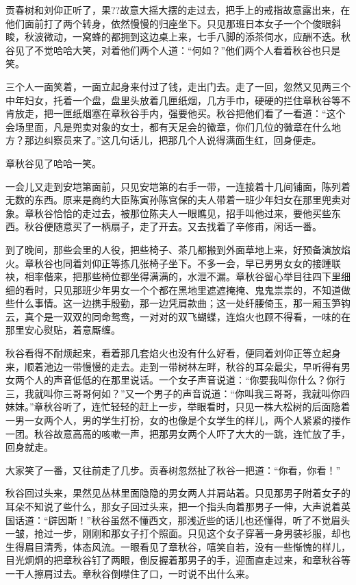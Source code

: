 \documentclass[12pt,UTF8]{ctexbook}
\begin{document}
{{{贡春树和刘仰正听了，果??故意大摇大摆的走过去，把手上的戒指故意露出来，在他们面前打了两个转身，依然慢慢的归座坐下。只见那班日本女子一个个俊眼斜睃，秋波微动，一窝蜂的都拥到这边桌上来，七手八脚的添茶伺水，应酬不迭。秋谷见了不觉哈哈大笑，对着他们两个人道：“何如？”他们两个人看着秋谷也只是笑。

三个人一面笑着，一面立起身来付过了钱，走出门去。走了一回，忽然又见两三个中年妇女，托着一个盘，盘里头放着几匣纸烟，几方手巾，硬硬的拦住章秋谷等不肯放走，把一匣纸烟塞在章秋谷手内，强要他买。秋谷把他们看了一看道：“这个会场里面，凡是兜卖对象的女士，都有天足会的徽章，你们几位的徽章在什么地方？那边纠察员来了。”这几句话儿，把那几个人说得满面生红，回身便走。

章秋谷见了哈哈一笑。

一会儿又走到安垲第面前，只见安垲第的右手一带，一连接着十几间铺面，陈列着无数的东西。原来是商约大臣陈寅孙陈宫保的夫人带着一班少年妇女在那里兜卖对象。章秋谷恰恰的走过去，被那位陈夫人一眼瞧见，招手叫他过来，要他买些东西。秋谷便随意买了一柄扇子，走了开去。又去找着了辛修甫，闲话一番。

到了晚间，那些会里的人役，把些椅子、茶几都搬到外面草地上来，好预备演放焰火。章秋谷也同着刘仰正等拣几张椅子坐下。不多一会，早已男男女女的接踵联袂，相率偕来，把那些椅位都坐得满满的，水泄不漏。章秋谷留心举目往四下里细细的看时，只见那班少年男女一个个都在黑地里遮遮掩掩、鬼鬼祟祟的，不知道做些什么事情。这一边携手殷勤，那一边凭肩款曲；这一处纤腰倚玉，那一厢玉笋钩云，真个是一双双的同命鸳鸯，一对对的双飞蝴蝶，连焰火也顾不得看，一味的在那里安心熨贴，着意厮缠。

秋谷看得不耐烦起来，看着那几套焰火也没有什么好看，便同着刘仰正等立起身来，顺着池边一带慢慢的走去。走到一带树林左畔，秋谷的耳朵最尖，早听得有男女两个人的声音低低的在那里说话。一个女子声音说道：“你要我叫你什么？你行三，我就叫你三哥哥何如？”又一个男子的声音说道：“你叫我三哥哥，我就叫你四妹妹。”章秋谷听了，连忙轻轻的赶上一步，举眼看时，只见一株大松树的后面隐着一男一女两个人，男的学生打扮，女的也像是个女学生的样儿，两个人紧紧的搂作一团。秋谷故意高高的咳嗽一声，把那男女两个人吓了大大的一跳，连忙放了手，回身就走。

大家笑了一番，又往前走了几步。贡春树忽然扯了秋谷一把道：“你看，你看！”

秋谷回过头来，果然见丛林里面隐隐的男女两人并肩站着。只见那男子附着女子的耳朵不知说了些什么，那女子回过头来，把一个指头向着那男子一伸，大声说着英国话道：“辟因斯！”秋谷虽然不懂西文，那浅近些的话儿也还懂得，听了不觉眉头一皱，抢过一步，刚刚和那女子打个照面。只见这个女子穿著一身男装衫服，却也生得眉目清秀，体态风流。一眼看见了章秋谷，嘻笑自若，没有一些惭愧的样儿，目光炯炯的把章秋谷钉了两眼，倒反握着那男子的手，迎面直走过来，和章秋谷等一干人擦肩过去。章秋谷倒噤住了口，一时说不出什么来。

}}}
\end{document}
